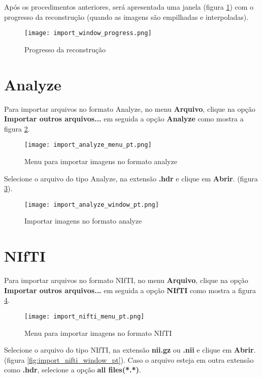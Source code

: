 Após os procedimentos anteriores, será apresentada uma janela (figura \ref{fig:prog_recons}) com o progresso
da reconstrução (quando as imagens são empilhadas e interpoladas).

\begin{figure}[!htb]
\centering
\texttt{[image: import\_window\_progress.png]} 
\caption{Progresso da reconstrução}
\label{fig:prog_recons}
\end{figure}

\newpage

\section{Analyze}

Para importar arquivos no formato Analyze, no menu \textbf{Arquivo}, clique na opção \textbf{Importar outros arquivos...} em seguida a opção \textbf{Analyze} como mostra a figura \ref{fig:analyze_menu}.

\begin{figure}[!htb]
\centering
\texttt{[image: import\_analyze\_menu\_pt.png]}
\caption{Menu para importar imagens no formato analyze}
\label{fig:analyze_menu}
\end{figure}

Selecione o arquivo do tipo Analyze, na extensão \textbf{.hdr} e clique em \textbf{Abrir}. (figura \ref{fig:analyze_import}).

\begin{figure}[!htb]
\centering
\texttt{[image: import\_analyze\_window\_pt.png]}
\caption{Importar imagens no formato analyze}
\label{fig:analyze_import}
\end{figure}

\section{NIfTI}

Para importar arquivos no formato NIfTI, no menu \textbf{Arquivo}, clique na opção \textbf{Importar outros arquivos...} em seguida a opção \textbf{NIfTI} como mostra a figura \ref{fig:import_nifti_menu_pt}.

\begin{figure}[!htb]
\centering
\texttt{[image: import\_nifti\_menu\_pt.png]}
\caption{Menu para importar imagens no formato NIfTI}
\label{fig:import_nifti_menu_pt}
\end{figure}

Selecione o arquivo do tipo NIfTI, na extensão \textbf{nii.gz} ou \textbf{.nii} e clique em \textbf{Abrir}. (figura \ref{fig:import_nifti_window_pt}). Caso o arquivo esteja em outra extensão como \textbf{.hdr}, selecione a opção \textbf{all files(*.*)}.

